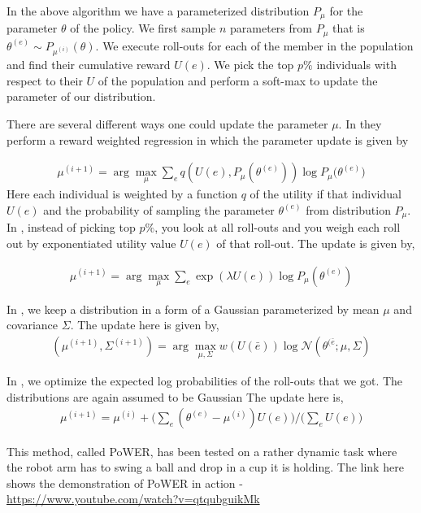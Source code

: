 \documentclass[11pt]{article}
\begin{document}
In the above algorithm we have a parameterized distribution $P_\mu$ for the parameter $\theta$ of the policy. We first sample $n$ parameters from $P_\mu$ that is $\theta^{(e)} \sim P_{\mu^{(i)}}(\theta)$. We execute roll-outs for each of the member in the population and find their cumulative reward $U(e)$. We pick the top $p\%$ individuals with respect to their $U$ of the population and perform a soft-max to update the parameter of our distribution. 

There are several different ways one could update the parameter $\mu$. In \cite{rwr} they perform a reward weighted regression in which the parameter update is given by 

\begin{align}
\mu^{(i+1)} = \arg \max_{\mu} \sum_eq(U(e),P_\mu(\theta^{(e)}))\log{P_\mu(\theta^{(e)}}) 
\end{align}
Here each individual is weighted by a function $q$ of the utility if that individual $U(e)$ and the probability of sampling the parameter $\theta^{(e)}$ from distribution $P_\mu$. In \cite{pi}, instead of picking top $p\%$, you look at all roll-outs and you weigh each roll out by exponentiated utility value $U(e)$ of that roll-out. The update is given by,

\begin{align}
\mu^{(i+1)} = \arg \max_{\mu} \sum_e \exp(\lambda U(e)) \log{P_\mu(\theta^{(e)})}
\end{align}

In \cite{cmaes}, we keep a distribution in a form of a Gaussian  parameterized by mean $\mu$ and covariance $\Sigma$. The update here is given by,
\begin{align}
(\mu^{(i+1)}, \Sigma^{(i+1)}) = \arg \max_{\mu,\Sigma }w(U(\bar{e}))\log{\mathcal{N}(\theta^{(\bar{e}};\mu,\Sigma)}
\end{align}

In \cite{power}, we optimize the expected log probabilities of the roll-outs that we got. The distributions are again assumed to be Gaussian The update here is,
\begin{align}
\mu^{(i+1)} = \mu^{(i)} + \Big(\sum_e(\theta^{(e)}-\mu^{(i)})U(e)\Big)/ \Big( \sum_e U(e) \Big)
\end{align}

This method, called PoWER, has been tested on a rather dynamic task where the robot arm has to swing a ball and drop in a cup it is holding. The link here shows the demonstration of PoWER in action - \url{https://www.youtube.com/watch?v=qtqubguikMk}
\end{document}
